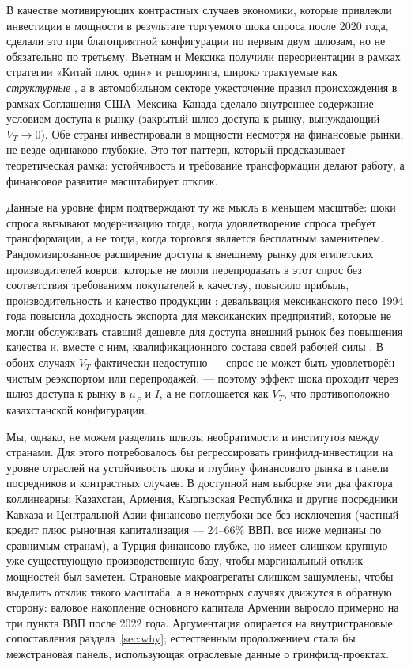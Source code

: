 \documentclass[12pt]{article}
\begin{document}
В качестве мотивирующих контрастных случаев экономики, которые привлекли инвестиции в
мощности в результате торгуемого шока спроса после 2020 года, сделали это при благоприятной
конфигурации по первым двум шлюзам, но не обязательно по третьему. Вьетнам и Мексика
получили переориентации в рамках стратегии «Китай плюс один» и решоринга, широко
трактуемые как \emph{структурные} \citep[напр.][]{juhaszlanerodrik2024}, а в автомобильном
секторе ужесточение правил происхождения в рамках Соглашения США--Мексика--Канада сделало
внутреннее содержание условием доступа к рынку (закрытый шлюз доступа к рынку, вынуждающий
$V_T \to 0$). Обе страны инвестировали в мощности несмотря на финансовые рынки, не везде
одинаково глубокие. Это тот паттерн, который предсказывает теоретическая рамка: устойчивость
и требование трансформации делают работу, а финансовое развитие масштабирует отклик.

Данные на уровне фирм подтверждают ту же мысль в меньшем масштабе: шоки спроса вызывают
модернизацию тогда, когда удовлетворение спроса требует трансформации, а не тогда, когда
торговля является бесплатным заменителем. Рандомизированное расширение доступа к внешнему
рынку для египетских производителей ковров, которые не могли перепродавать в этот спрос без
соответствия требованиям покупателей к качеству, повысило прибыль, производительность и
качество продукции \citep{atkinkhandelwalosman2017}; девальвация мексиканского песо 1994
года повысила доходность экспорта для мексиканских предприятий, которые не могли
обслуживать ставший дешевле для доступа внешний рынок без повышения качества и, вместе с
ним, квалификационного состава своей рабочей силы \citep{verhoogen2008}. В обоих случаях
$V_T$ фактически недоступно — спрос не может быть удовлетворён чистым реэкспортом или
перепродажей, — поэтому эффект шока проходит через шлюз доступа к рынку в $\mu_P$ и $I$, а
не поглощается как $V_T$, что противоположно казахстанской конфигурации.

Мы, однако, не можем разделить шлюзы необратимости и институтов между странами. Для этого
потребовалось бы регрессировать гринфилд-инвестиции на уровне отраслей на устойчивость шока
и глубину финансового рынка в панели посредников и контрастных случаев. В доступной нам
выборке эти два фактора коллинеарны: Казахстан, Армения, Кыргызская Республика и другие
посредники Кавказа и Центральной Азии финансово неглубоки все без исключения (частный
кредит плюс рыночная капитализация — 24--66\% ВВП, все ниже медианы по сравнимым странам), а
Турция финансово глубже, но имеет слишком крупную уже существующую производственную базу,
чтобы маргинальный отклик мощностей был заметен. Страновые макроагрегаты слишком зашумлены,
чтобы выделить отклик такого масштаба, а в некоторых случаях движутся в обратную сторону:
валовое накопление основного капитала Армении выросло примерно на три пункта ВВП после
2022 года. Аргументация опирается на внутристрановые сопоставления
раздела~\ref{sec:why}; естественным продолжением стала бы межстрановая панель, использующая
отраслевые данные о гринфилд-проектах.
\end{document}
